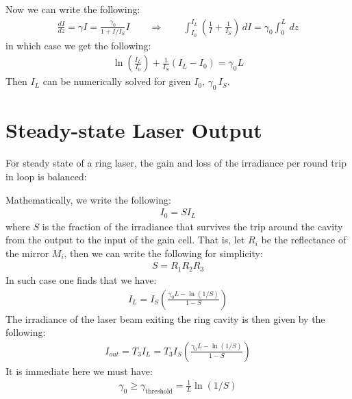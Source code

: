 \documentclass[11pt]{book}
\theoremstyle{break}
\theoremstyle{break}
\begin{document}
Now we can write the following:
\begin{align*}
\frac{dI}{dz} = \gamma I = \frac{\gamma_0}{1+ I/I_S} I \qquad \Rightarrow \qquad \int_{I_0}^{I_L}\left( \frac{1}{I}+\frac{1}{I_S}\right) \, dI = \gamma_0 \int_0^L \, dz
\end{align*}
in which case we get the following:
\begin{align*}
\ln\left( \frac{I_L}{I_0}\right) + \frac{1}{I_S}(I_L - I_0) = \gamma_0 L
\end{align*}
Then $I_L$ can be numerically solved for given $I_0,\, \gamma_0\, I_S$. 
\section[Steady-state Laser Output]{\color{red}Steady-state Laser Output \color{black}}
For steady state of a ring laser, the gain and loss of the irradiance per round trip in loop is balanced:
\begin{center}

\end{center}
Mathematically, we write the following:
\begin{align*}
I_0 = SI_L
\end{align*}
where $S$ is the fraction of the irradiance that survives the trip around the cavity from the output to the input of the gain cell. That is, let $R_i$ be the reflectance of the mirror $M_i$, then we can write the following for simplicity:
\begin{align*}
S = R_1 R_2 R_3
\end{align*}
In such case one finds that we have:
\begin{align*}
I_L = I_S \left( \frac{\gamma_0 L - \ln(1/S)}{1-S}\right) 
\end{align*}
The irradiance of the laser beam exiting the ring cavity is then given by the following:
\begin{align*}
I_{out} = T_3 I_L = T_3 I_S\left( \frac{\gamma_0 L - \ln(1/S)}{1-S}\right)
\end{align*}
It is immediate here we must have:
\begin{align*}
\gamma_0 \geq \gamma_{\text{threshold}} = \frac{1}{L}\ln(1/S)
\end{align*}
\end{document}
